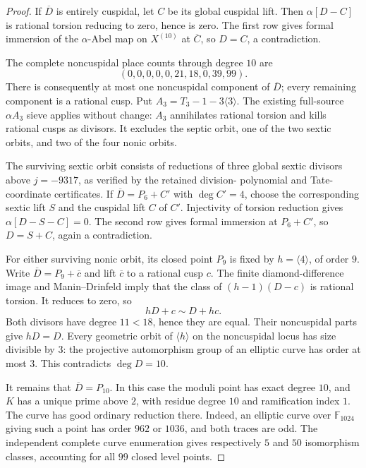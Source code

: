 \begin{proof}
If $\overline D$ is entirely cuspidal, let $C$ be its global cuspidal
lift. Then $\alpha[D-C]$ is rational torsion reducing to zero, hence
is zero. The first row gives formal immersion of the $\alpha$-Abel
map on $X^{(10)}$ at $\overline C$, so $D=C$, a contradiction.

The complete noncuspidal place counts through degree $10$ are
\[
 (0,0,0,0,0,21,18,0,39,99).
\]
There is consequently at most one noncuspidal component of
$\overline D$; every remaining component is a rational cusp.
Put $A_3=T_3-1-3\langle3\rangle$.
The existing full-source $\alpha A_3$ sieve applies without change:
$A_3$ annihilates rational torsion and kills rational cusps as divisors.
It excludes the septic orbit, one of the two sextic orbits, and two of
the four nonic orbits.

The surviving sextic orbit consists of reductions of three global
sextic divisors above $j=-9317$, as verified by the retained division-
polynomial and Tate-coordinate certificates. If
$\overline D=P_6+C'$ with $\deg C'=4$, choose the corresponding sextic
lift $S$ and the cuspidal lift $C$ of $C'$. Injectivity of torsion
reduction gives $\alpha[D-S-C]=0$. The second row gives formal
immersion at $P_6+C'$, so $D=S+C$, again a contradiction.

For either surviving nonic orbit, its closed point $P_9$ is fixed by
$h=\langle4\rangle$, of order $9$. Write $\overline D=P_9+\overline c$
and lift $\overline c$ to a rational cusp $c$.
The finite diamond-difference image and Manin--Drinfeld imply that
the class of $(h-1)(D-c)$ is rational torsion. It reduces to zero, so
\[
 hD+c\sim D+hc.
\]
Both divisors have degree $11<18$, hence they are equal. Their
noncuspidal parts give $hD=D$. Every geometric orbit of $\langle h\rangle$
on the noncuspidal locus has size divisible by $3$: the projective
automorphism group of an elliptic curve has order at most $3$.
This contradicts $\deg D=10$.

It remains that $\overline D=P_{10}$. In this case the moduli point has
exact degree $10$, and $K$ has a unique prime above $2$, with residue
degree $10$ and ramification index $1$. The curve has good ordinary
reduction there. Indeed, an elliptic curve over $\mathbb F_{1024}$
giving such a point has order $962$ or $1036$, and both traces are odd.
The independent complete curve enumeration gives respectively $5$
and $50$ isomorphism classes, accounting for all $99$ closed level
points.


\end{proof}
